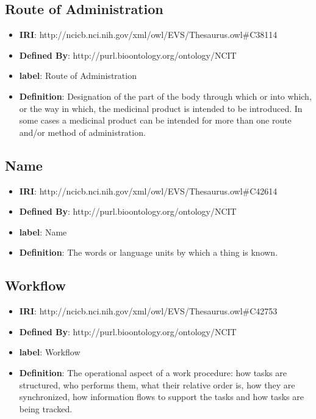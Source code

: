 \documentclass[a4paper,12pt,oneside]{article}
\begin{document}
  \subsection{Route of Administration}

  \begin{itemize}
     \item \textbf{IRI}: http://ncicb.nci.nih.gov/xml/owl/EVS/Thesaurus.owl\#C38114
     \item \textbf{Defined By}: http://purl.bioontology.org/ontology/NCIT
     \item \textbf{label}: Route of Administration
     \item \textbf{Definition}: Designation of the part of the body through which or into which, or the way in which, the medicinal product is intended to be introduced. In some cases a medicinal product can be intended for more than one route and/or method of administration.
  \end{itemize}


  \subsection{Name}

  \begin{itemize}
     \item \textbf{IRI}: http://ncicb.nci.nih.gov/xml/owl/EVS/Thesaurus.owl\#C42614
     \item \textbf{Defined By}: http://purl.bioontology.org/ontology/NCIT
     \item \textbf{label}: Name
     \item \textbf{Definition}: The words or language units by which a thing is known.
  \end{itemize}


  \subsection{Workflow}

  \begin{itemize}
     \item \textbf{IRI}: http://ncicb.nci.nih.gov/xml/owl/EVS/Thesaurus.owl\#C42753
     \item \textbf{Defined By}: http://purl.bioontology.org/ontology/NCIT
     \item \textbf{label}: Workflow
     \item \textbf{Definition}: The operational aspect of a work procedure: how tasks are structured, who performs them, what their relative order is, how they are synchronized, how information flows to support the tasks and how tasks are being tracked.
  \end{itemize}
\end{document}
